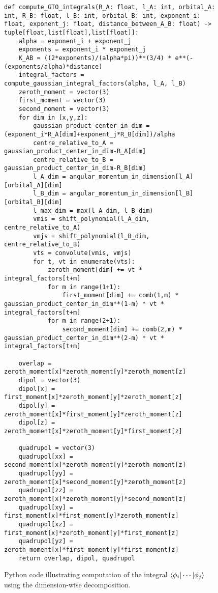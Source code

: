 \begin{figure}[H]
\begin{verbatim}
def compute_GTO_integrals(R_A: float, l_A: int, orbital_A: int, R_B: float, l_B: int, orbital_B: int, exponent_i: float, exponent_j: float, distance_between_A_B: float) -> tuple[float,list[float],list[float]]:
    alpha = exponent_i + exponent_j
    exponents = exponent_i * exponent_j
    K_AB = ((2*exponents)/(alpha*pi))**(3/4) * e**(-(exponents/alpha)*distance)
    integral_factors = compute_gaussian_integral_factors(alpha, l_A, l_B)
    zeroth_moment = vector(3)
    first_moment = vector(3)
    second_moment = vector(3)
    for dim in [x,y,z]:
        gaussian_product_center_in_dim = (exponent_i*R_A[dim]+exponent_j*R_B[dim])/alpha
        centre_relative_to_A = gaussian_product_center_in_dim-R_A[dim]
        centre_relative_to_B = gaussian_product_center_in_dim-R_B[dim]
        l_A_dim = angular_momentum_in_dimension[l_A][orbital_A][dim]
        l_B_dim = angular_momentum_in_dimension[l_B][orbital_B][dim]
        l_max_dim = max(l_A_dim, l_B_dim)
        vmis = shift_polynomial(l_A_dim, centre_relative_to_A)
        vmjs = shift_polynomial(l_B_dim, centre_relative_to_B)
        vts = convolute(vmis, vmjs)
        for t, vt in enumerate(vts):
            zeroth_moment[dim] += vt * integral_factors[t+m]
            for m in range(1+1):
                first_moment[dim] += comb(1,m) * gaussian_product_center_in_dim**(1-m) * vt * integral_factors[t+m]
            for m in range(2+1):
                second_moment[dim] += comb(2,m) * gaussian_product_center_in_dim**(2-m) * vt * integral_factors[t+m]

    overlap = zeroth_moment[x]*zeroth_moment[y]*zeroth_moment[z]
    dipol = vector(3)
    dipol[x] = first_moment[x]*zeroth_moment[y]*zeroth_moment[z]
    dipol[y] = zeroth_moment[x]*first_moment[y]*zeroth_moment[z]
    dipol[z] = zeroth_moment[x]*zeroth_moment[y]*first_moment[z]

    quadrupol = vector(3)
    quadrupol[xx] = second_moment[x]*zeroth_moment[y]*zeroth_moment[z]
    quadrupol[yy] = zeroth_moment[x]*second_moment[y]*zeroth_moment[z]
    quadrupol[zz] = zeroth_moment[x]*zeroth_moment[y]*second_moment[z]
    quadrupol[xy] = first_moment[x]*first_moment[y]*zeroth_moment[z]
    quadrupol[xz] = first_moment[x]*zeroth_moment[y]*first_moment[z]
    quadrupol[yz] = zeroth_moment[x]*first_moment[y]*first_moment[z]
    return overlap, dipol, quadrupol
\end{verbatim}
    \caption{Python code illustrating computation of the integral $\braket{\phi_i|\cdots|\phi_j}$ using the dimension-wise decomposition.}
\end{figure}

